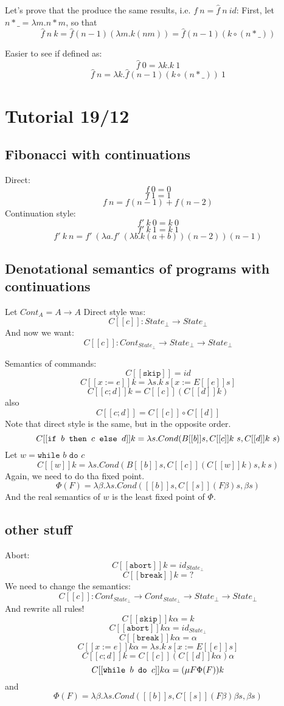\documentclass{article}
\begin{document}
Let's prove that the produce the same results, i.e. $ f\ n=\hat{f}\ n\ id$:
First, let $ n*\_ =\lambda m.n*m$, so that 
$$\hat{f}\ n\ k = \hat{f} (n - 1)(\lambda m.k(nm))=\hat{f}(n-1)(k\circ (n*\_))$$

Easier to see if defined as:
$$\hat{f}\ 0=\lambda k.k\ 1$$
$$\hat{f}\ n=\lambda k.\hat{f}(n-1)(k\circ(n*\_))\ 1$$
\section{Tutorial 19/12}
\subsection{Fibonacci with continuations}
Direct:
$$f\ 0=0$$
$$f\ 1=1$$
$$f\ n=f(n-1)+f(n-2)$$
Continuation style:
$$f'\ k\ 0=k\ 0$$
$$f'\ k\ 1=k\ 1$$
$$f'\ k\ n=f'\ (\lambda a.f'\ (\lambda b.k(a+b))(n-2))(n-1)$$

\subsection{Denotational semantics of programs with continuations}
Let $ Cont_A = A \rightarrow A $
Direct style was:
$$C[[c]]:State_\bot \rightarrow State_\bot$$
And now we want:
$$C[[c]]:Cont_{State_\bot} \rightarrow State_\bot \rightarrow State_\bot$$

Semantics of commands:
$$C[[\texttt{skip}]]=id$$
$$C[[x:=e]]k=\lambda s.k\ s[x:=E[[e]]s]$$
$$C[[c;d]]k=C[[c]](C[[d]]k)$$
also
$$C[[c;d]]=C[[c]]\circ C[[d]]$$
Note that direct style is the same, but in the opposite order.
$$C[[\texttt{if $ b $ then $ c $ else $ d $}]]k=\lambda s. Cond(B[[b]]s, C[[c]]k\ s, C[[d]]k\ s)$$
Let $ w=\texttt{while $b$ do $c$} $
$$C[[w]]k=\lambda s.Cond(B[[b]]s, C[[c]](C[[w]]k)s,k\ s) $$
Again, we need to do tha fixed point.
$$\Phi(F)=\lambda\beta.\lambda s.Cond([[b]]s,C[[s]](F\beta)s, \beta s)$$
And the real semantics of $ w $ is the least fixed point of $ \Phi $.
\subsection{other stuff}
Abort:
$$ C[[\texttt{abort}]]k=id_{State_\bot} $$
$$ C[[\texttt{break}]]k=?$$
We need to change the semantics:
$$C[[c]]:Cont_{State_\bot} \rightarrow Cont_{State_\bot} \rightarrow State_\bot \rightarrow State_\bot$$
And rewrite all rules!
$$C[[\texttt{skip}]]k\alpha=k$$
$$ C[[\texttt{abort}]]k\alpha=id_{State_\bot} $$
$$C[[\texttt{break}]]k\alpha=\alpha$$
$$C[[x:=e]]k\alpha=\lambda s.k\ s[x:=E[[e]]s]$$
$$C[[c;d]]k=C[[c]](C[[d]]k\alpha)\alpha$$
$$C[[\texttt{while $ b $ do $ c $}]]k\alpha=(\mu F\Phi(F))k$$
and 
$$\Phi(F)=\lambda\beta.\lambda s.Cond([[b]]s,C[[s]](F\beta)\beta s, \beta s)$$
\end{document}

